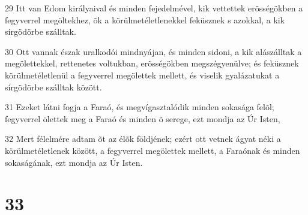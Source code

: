 \par 29 Itt van Edom királyaival és minden fejedelmével, kik vettettek erõsségökben a fegyverrel megöltekhez, õk a körülmetéletlenekkel feküsznek s azokkal, a kik sírgödörbe szálltak.
\par 30 Ott vannak észak uralkodói mindnyájan, és minden sidoni, a kik alászálltak a megölettekkel, rettenetes voltukban, erõsségökben megszégyenülve; és feküsznek körülmetéletlenül a fegyverrel megölettek mellett, és viselik gyalázatukat a sírgödörbe szálltak között.
\par 31 Ezeket látni fogja a Faraó, és megvígasztalódik minden sokasága felõl; fegyverrel ölettek meg a Faraó és minden õ serege, ezt mondja az Úr Isten,
\par 32 Mert félelmére adtam õt az élõk földjének; ezért ott vetnek ágyat néki a körülmetéletlenek között, a fegyverrel megölettek mellett, a Faraónak és minden sokaságának, ezt mondja az Úr Isten.

\chapter{33}

